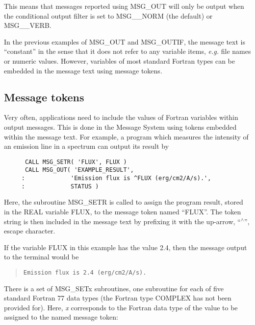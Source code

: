 This means that messages reported using MSG\_OUT will only be output when the
conditional output filter is set to MSG\_\_NORM (the default) or MSG\_\_VERB.

In the previous examples of MSG\_OUT and MSG\_OUTIF, the message text is 
``constant'' in the sense that it does not refer to any variable items, 
{\em e.g.} file names or numeric values. 
However, variables of most standard Fortran types can be embedded in the
message text using message tokens.


\subsection {Message tokens}

Very often, applications need to include the values of Fortran variables 
within output messages. 
This is done in the Message System using tokens embedded within the message
text.
For example, a program which measures the intensity of an emission line in
a spectrum can output its result by

\begin {small}
\begin{verbatim}
      CALL MSG_SETR( 'FLUX', FLUX )
      CALL MSG_OUT( 'EXAMPLE_RESULT', 
     :             'Emission flux is ^FLUX (erg/cm2/A/s).',
     :             STATUS )
\end{verbatim}
\end {small}

Here, the subroutine MSG\_SETR is called to assign the program result, stored
in the REAL variable FLUX, to the message token named ``FLUX''. 
The token string is then included in the message text by prefixing it with the
up-arrow, ``$^\wedge$'', escape character. 

If the variable FLUX in this example has the value 2.4, then
the message output to the terminal would be

\begin {quote}
\begin {small}
\begin{verbatim}
Emission flux is 2.4 (erg/cm2/A/s).
\end{verbatim}
\end {small}
\end {quote}

There is a set of MSG\_SETx subroutines, one subroutine for each of five
standard Fortran 77 data types (the Fortran type COMPLEX has not been provided
for).
Here, {\em x} corresponds to the Fortran data type of the value to be assigned
to the named message token:

